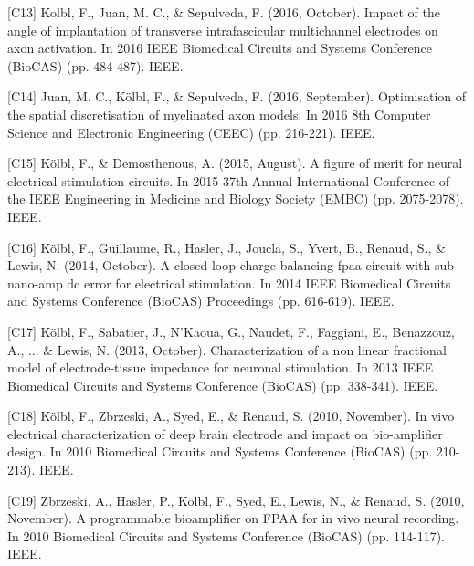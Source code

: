 \begin{cvskills}
  \cvskill
    {[C13]} %
    {Kolbl, F., Juan, M. C., \& Sepulveda, F. (2016, October). Impact of the angle of implantation of transverse intrafascicular multichannel electrodes on axon activation. In 2016 IEEE Biomedical Circuits and Systems Conference (BioCAS) (pp. 484-487). IEEE.} %
\end{cvskills}  
\begin{cvskills} 
  \cvskill
    {[C14]} %
    {Juan, M. C., Kölbl, F., \& Sepulveda, F. (2016, September). Optimisation of the spatial discretisation of myelinated axon models. In 2016 8th Computer Science and Electronic Engineering (CEEC) (pp. 216-221). IEEE.} %
\end{cvskills}  
\begin{cvskills}
  \cvskill
    {[C15]} %
    {Kölbl, F., \& Demosthenous, A. (2015, August). A figure of merit for neural electrical stimulation circuits. In 2015 37th Annual International Conference of the IEEE Engineering in Medicine and Biology Society (EMBC) (pp. 2075-2078). IEEE.} %
\end{cvskills}  
\begin{cvskills}
  \cvskill
    {[C16]} %
    {Kölbl, F., Guillaume, R., Hasler, J., Joucla, S., Yvert, B., Renaud, S., \& Lewis, N. (2014, October). A closed-loop charge balancing fpaa circuit with sub-nano-amp dc error for electrical stimulation. In 2014 IEEE Biomedical Circuits and Systems Conference (BioCAS) Proceedings (pp. 616-619). IEEE.} %
\end{cvskills}  
\begin{cvskills}
  \cvskill
    {[C17]} %
    {Kölbl, F., Sabatier, J., N'Kaoua, G., Naudet, F., Faggiani, E., Benazzouz, A., ... \& Lewis, N. (2013, October). Characterization of a non linear fractional model of electrode-tissue impedance for neuronal stimulation. In 2013 IEEE Biomedical Circuits and Systems Conference (BioCAS) (pp. 338-341). IEEE.} %
\end{cvskills}  
\begin{cvskills}    
  \cvskill
    {[C18]} %
    {Kölbl, F., Zbrzeski, A., Syed, E., \& Renaud, S. (2010, November). In vivo electrical characterization of deep brain electrode and impact on bio-amplifier design. In 2010 Biomedical Circuits and Systems Conference (BioCAS) (pp. 210-213). IEEE.} %
\end{cvskills}  
\begin{cvskills}   
  \cvskill
    {[C19]} %
    {Zbrzeski, A., Hasler, P., Kölbl, F., Syed, E., Lewis, N., \& Renaud, S. (2010, November). A programmable bioamplifier on FPAA for in vivo neural recording. In 2010 Biomedical Circuits and Systems Conference (BioCAS) (pp. 114-117). IEEE.} %
\end{cvskills}

